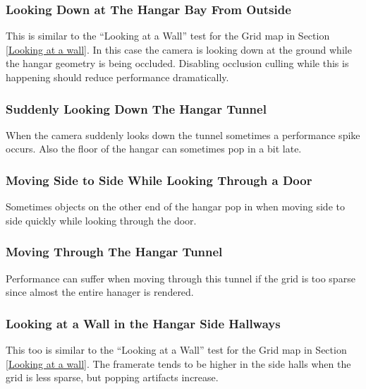 \documentclass[12pt]{ucthesis}
\begin{document}
\subsubsection{Looking Down at The Hangar Bay From Outside}
\label{Looking Down at The Hangar Bay From Outside}

This is similar to the ``Looking at a Wall'' test for the Grid map in Section \ref{Looking at a wall}.
In this case the camera is looking down at the ground while the hangar geometry is being occluded.
Disabling occlusion culling while this is happening should reduce performance dramatically.

\subsubsection{Suddenly Looking Down The Hangar Tunnel}
\label{suddenly-looking-down-the-hangar-tunnel}

When the camera suddenly looks down the tunnel sometimes a performance spike occurs.
Also the floor of the hangar can sometimes pop in a bit late.

\subsubsection{Moving Side to Side While Looking Through a Door}
\label{Moving Side to Side While Looking Through a Door}

Sometimes objects on the other end of the hangar pop in when moving side to side quickly while looking through the door.

\subsubsection{Moving Through The Hangar Tunnel}
\label{Moving Through The Hangar Tunnel}

Performance can suffer when moving through this tunnel if the grid is too sparse since almost the entire hanager is rendered.

\subsubsection{Looking at a Wall in the Hangar Side Hallways}
\label{Looking at a Wall in the Hangar Side Hallways}

This too is similar to the ``Looking at a Wall'' test for the Grid map in Section \ref{Looking at a wall}.
The framerate tends to be higher in the side halls when the grid is less sparse, but popping artifacts increase.
\end{document}
